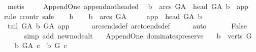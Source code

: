 \begin{isabellebody}
\ metis%
\endisatagproof
{\isafoldproof}%
%
\isadelimproof
\ \ \isanewline
%
\endisadelimproof
\isanewline
\isanewline
{}\isamarkupfalse%
\ {\isacharparenleft}{\kern0pt}\ Append{\isacharunderscore}{\kern0pt}One{\isacharparenright}{\kern0pt}\ append{\isacharunderscore}{\kern0pt}not{\isacharunderscore}{\kern0pt}headed{\isacharcolon}{\kern0pt}\isanewline
\ \ {\isachardoublequoteopen}{\isasymforall}b\ {\isasymin}\ arcs\ G{\isacharunderscore}{\kern0pt}A{\isachardot}{\kern0pt}\ {\isasymnot}\ head\ G{\isacharunderscore}{\kern0pt}A\ b\ {\isacharequal}{\kern0pt}\ app{\isachardoublequoteclose}\isanewline
%
\isadelimproof
%
\endisadelimproof
%
\isatagproof
{}\isamarkupfalse%
{\isacharparenleft}{\kern0pt}rule\ ccontr{\isacharcomma}{\kern0pt}\ safe{\isacharparenright}{\kern0pt}\isanewline
\ \ \isamarkupfalse%
\ b\isanewline
\ \ \isamarkupfalse%
\ {\isachardoublequoteopen}b\ {\isasymin}\ arcs\ G{\isacharunderscore}{\kern0pt}A{\isachardoublequoteclose}\isanewline
\ \ \ \ \ {\isachardoublequoteopen}app\ {\isacharequal}{\kern0pt}\ head\ G{\isacharunderscore}{\kern0pt}A\ b{\isachardoublequoteclose}\isanewline
\ \ \isamarkupfalse%
\ \isamarkupfalse%
\ {\isachardoublequoteopen}tail\ G{\isacharunderscore}{\kern0pt}A\ b\ {\isasymrightarrow}\isactrlbsub G{\isacharunderscore}{\kern0pt}A\isactrlesub \ app{\isachardoublequoteclose}\isanewline
\ \ \ \ \isamarkupfalse%
\ arcs{\isacharunderscore}{\kern0pt}ends{\isacharunderscore}{\kern0pt}def\ arc{\isacharunderscore}{\kern0pt}to{\isacharunderscore}{\kern0pt}ends{\isacharunderscore}{\kern0pt}def\isanewline
\ \ \ \ \isamarkupfalse%
\ auto\ \isanewline
\ \ \isamarkupfalse%
\ \isamarkupfalse%
\ False\ \isanewline
\ \ \ \ \isamarkupfalse%
\ {\isacharparenleft}{\kern0pt}simp\ add{\isacharcolon}{\kern0pt}\ new{\isacharunderscore}{\kern0pt}node{\isacharunderscore}{\kern0pt}alt{\isacharparenright}{\kern0pt}\ \isanewline
{}\isamarkupfalse%
%
\endisatagproof
{\isafoldproof}%
%
\isadelimproof
\isanewline
%
\endisadelimproof
\isanewline
{}\isamarkupfalse%
\ {\isacharparenleft}{\kern0pt}\ Append{\isacharunderscore}{\kern0pt}One{\isacharparenright}{\kern0pt}\ dominates{\isacharunderscore}{\kern0pt}preserve{\isacharcolon}{\kern0pt}\isanewline
\ \ \ {\isachardoublequoteopen}b\ {\isasymin}\ verts\ G{\isachardoublequoteclose}\isanewline
\ \ \ {\isachardoublequoteopen}b\ {\isasymrightarrow}\isactrlbsub G{\isacharunderscore}{\kern0pt}A\isactrlesub \ c\ {\isasymlongleftrightarrow}\ b\ {\isasymrightarrow}\isactrlbsub G\isactrlesub \ c{\isachardoublequoteclose}\isanewline

\end{isabellebody}

